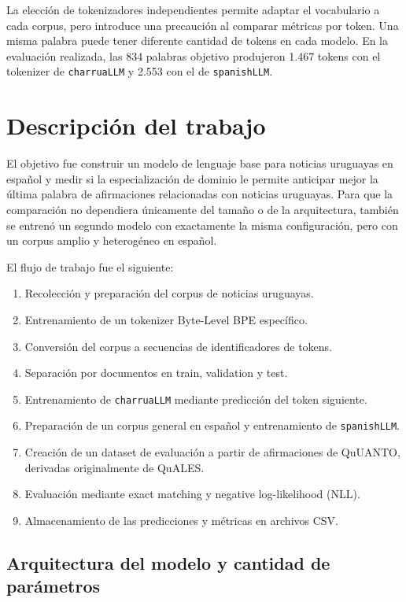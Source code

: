 \documentclass[11pt,a4paper]{article}
\newcommand{\charrua}{\texttt{charruaLLM}}
\newcommand{\spanishmodel}{\texttt{spanishLLM}}
\begin{document}
La elección de tokenizadores independientes permite adaptar el vocabulario a
cada corpus, pero introduce una precaución al comparar métricas por token. Una
misma palabra puede tener diferente cantidad de tokens en cada modelo. En la
evaluación realizada, las 834 palabras objetivo produjeron 1.467 tokens con el
tokenizer de \charrua{} y 2.553 con el de \spanishmodel.


\section{Descripción del trabajo}

El objetivo fue construir un modelo de lenguaje base para noticias uruguayas en
español y medir si la especialización de dominio le permite anticipar mejor la
última palabra de afirmaciones relacionadas con noticias uruguayas. Para que la
comparación no dependiera únicamente del tamaño o de la arquitectura, también
se entrenó un segundo modelo con exactamente la misma configuración, pero con
un corpus amplio y heterogéneo en español.

El flujo de trabajo fue el siguiente:

\begin{enumerate}
    \item Recolección y preparación del corpus de noticias uruguayas.
    \item Entrenamiento de un tokenizer Byte-Level BPE específico.
    \item Conversión del corpus a secuencias de identificadores de tokens.
    \item Separación por documentos en train, validation y test.
    \item Entrenamiento de \charrua{} mediante predicción del token siguiente.
    \item Preparación de un corpus general en español y entrenamiento de
          \spanishmodel.
    \item Creación de un dataset de evaluación a partir de afirmaciones de
          QuUANTO, derivadas originalmente de QuALES.
    \item Evaluación mediante exact matching y negative log-likelihood (NLL).
    \item Almacenamiento de las predicciones y métricas en archivos CSV.
\end{enumerate}


\subsection{Arquitectura del modelo y cantidad de parámetros}
\end{document}

